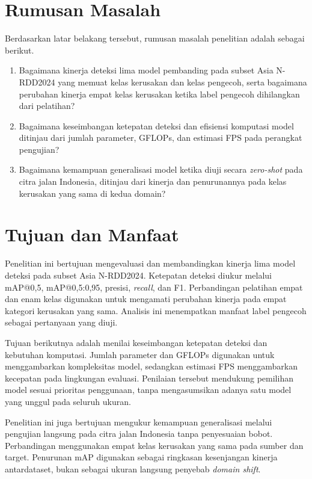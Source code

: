 \section{Rumusan Masalah}
Berdasarkan latar belakang tersebut, rumusan masalah penelitian adalah sebagai berikut.
\begin{enumerate}
\item Bagaimana kinerja deteksi lima model pembanding pada subset Asia N-RDD2024 yang memuat kelas kerusakan dan kelas pengecoh, serta bagaimana perubahan kinerja empat kelas kerusakan ketika label pengecoh dihilangkan dari pelatihan?
\item Bagaimana keseimbangan ketepatan deteksi dan efisiensi komputasi model ditinjau dari jumlah parameter, GFLOPs, dan estimasi FPS pada perangkat pengujian?
\item Bagaimana kemampuan generalisasi model ketika diuji secara \textit{zero-shot} pada citra jalan Indonesia, ditinjau dari kinerja dan penurunannya pada kelas kerusakan yang sama di kedua domain?
\end{enumerate}

\section{Tujuan dan Manfaat}
Penelitian ini bertujuan mengevaluasi dan membandingkan kinerja lima model deteksi pada subset Asia N-RDD2024. Ketepatan deteksi diukur melalui mAP@0,5, mAP@0,5:0,95, presisi, \textit{recall}, dan F1. Perbandingan pelatihan empat dan enam kelas digunakan untuk mengamati perubahan kinerja pada empat kategori kerusakan yang sama. Analisis ini menempatkan manfaat label pengecoh sebagai pertanyaan yang diuji.

Tujuan berikutnya adalah menilai keseimbangan ketepatan deteksi dan kebutuhan komputasi. Jumlah parameter dan GFLOPs digunakan untuk menggambarkan kompleksitas model, sedangkan estimasi FPS menggambarkan kecepatan pada lingkungan evaluasi. Penilaian tersebut mendukung pemilihan model sesuai prioritas penggunaan, tanpa mengasumsikan adanya satu model yang unggul pada seluruh ukuran.

Penelitian ini juga bertujuan mengukur kemampuan generalisasi melalui pengujian langsung pada citra jalan Indonesia tanpa penyesuaian bobot. Perbandingan menggunakan empat kelas kerusakan yang sama pada sumber dan target. Penurunan mAP digunakan sebagai ringkasan kesenjangan kinerja antardataset, bukan sebagai ukuran langsung penyebab \textit{domain shift}.

